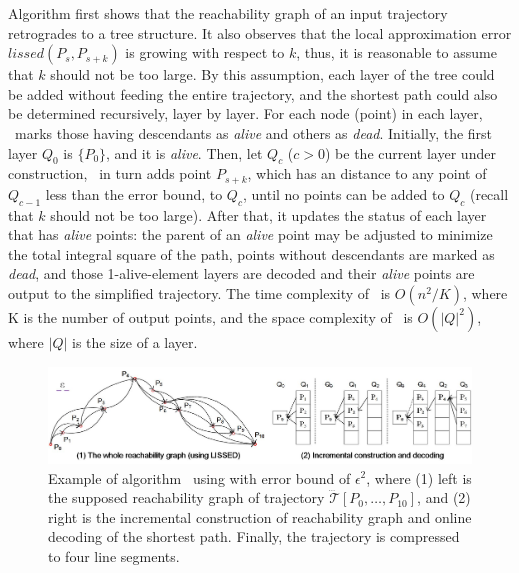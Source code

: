 {Algorithm \dagots first shows that the reachability graph of an input trajectory retrogrades to a tree structure. It also observes that the local approximation error $lissed(P_s,P_{s+k})$ is growing with respect to $k$, thus, it is reasonable to assume that $k$ should not be too large.
By this assumption, each layer of the tree could be added without feeding the entire trajectory, and the shortest path could also be determined recursively, \ie layer by layer.}
%
{For each node (point) in each layer, \dagots~marks those having descendants as \emph{alive} and others as \emph{dead}.
Initially, the first layer $Q_0$ is $\{P_0\}$, and it is \emph{alive}. }
%
{Then, let $Q_c$ ($c>0$) be the current layer under construction,
\dagots~in turn adds point $P_{s+k}$, which has an \lissed distance to any point of $Q_{c-1}$ less than the error bound, to $Q_c$, until no points can be added to $Q_c$ (recall that $k$ should not be too large). After that, it updates the status of each layer that has \emph{alive} points: the parent of an \emph{alive} point may be adjusted to minimize the total integral square \sed of the path, points without descendants are marked as \emph{dead}, and those 1-alive-element layers are decoded and their \emph{alive} points are output to the simplified trajectory. }
%
{The time complexity of \dagots~is $O(n^2/K)$, where K is the number of output points, and the space complexity of \dagots~is $O(|Q|^2)$, where $|Q|$ is the size of a layer.}

\begin{figure}[tb!]
	\centering
	\includegraphics[scale=0.79]{Figures/Fig-DOTS.jpg}
	\vspace{-2ex}
	\caption{\small {Example of algorithm \dagots~using \lissed with error bound of $\epsilon^2$, where (1) left is the supposed reachability graph of trajectory $\dddot{\mathcal{T}}[P_0, \ldots, P_{10}]$, and (2) right is the incremental construction of reachability graph and online decoding of the shortest path. Finally, the trajectory is compressed to four line segments.} }
	\vspace{-1ex}
	\label{fig:dots}
\end{figure}



